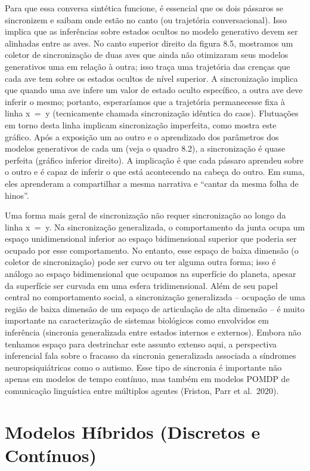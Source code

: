 \documentclass[
  12pt,
]{book}
\begin{document}
Para que essa conversa sintética funcione, é essencial que os dois pássaros se sincronizem e saibam onde estão no canto (ou trajetória conversacional). Isso implica que as inferências sobre estados ocultos no modelo generativo devem ser alinhadas entre as aves. No canto superior direito da figura 8.5, mostramos um coletor de sincronização de duas aves que ainda não otimizaram seus modelos generativos uma em relação à outra; isso traça uma trajetória das crenças que cada ave tem sobre os estados ocultos de nível superior. A sincronização implica que quando uma ave infere um valor de estado oculto específico, a outra ave deve inferir o mesmo; portanto, esperaríamos que a trajetória permanecesse fixa à linha x  =  y (tecnicamente chamada sincronização idêntica do caos). Flutuações em torno desta linha implicam sincronização imperfeita, como mostra este gráfico. Após a exposição um ao outro e o aprendizado dos parâmetros dos modelos generativos de cada um (veja o quadro 8.2), a sincronização é quase perfeita (gráfico inferior direito). A implicação é que cada pássaro aprendeu sobre o outro e é capaz de inferir o que está acontecendo na cabeça do outro. Em suma, eles aprenderam a compartilhar a mesma narrativa e ``cantar da mesma folha de hinos''.

Uma forma mais geral de sincronização não requer sincronização ao longo da linha x  =  y. Na sincronização generalizada, o comportamento da junta ocupa um espaço unidimensional inferior ao espaço bidimensional superior que poderia ser ocupado por esse comportamento. No entanto, esse espaço de baixa dimensão (o coletor de sincronização) pode ser curvo ou ter alguma outra forma; isso é análogo ao espaço bidimensional que ocupamos na superfície do planeta, apesar da superfície ser curvada em uma esfera tridimensional. Além de seu papel central no comportamento social, a sincronização generalizada -- ocupação de uma região de baixa dimensão de um espaço de articulação de alta dimensão -- é muito importante na caracterização de sistemas biológicos como envolvidos em inferência (sincronia generalizada entre estados internos e externos). Embora não tenhamos espaço para destrinchar este assunto extenso aqui, a perspectiva inferencial fala sobre o fracasso da sincronia generalizada associada a síndromes neuropsiquiátricas como o autismo. Esse tipo de sincronia é importante não apenas em modelos de tempo contínuo, mas também em modelos POMDP de comunicação linguística entre múltiplos agentes (Friston, Parr et al.~2020).

\hypertarget{modelos-huxedbridos-discretos-e-contuxednuos}{%
\section{Modelos Híbridos (Discretos e Contínuos)}\label{modelos-huxedbridos-discretos-e-contuxednuos}}
\end{document}
